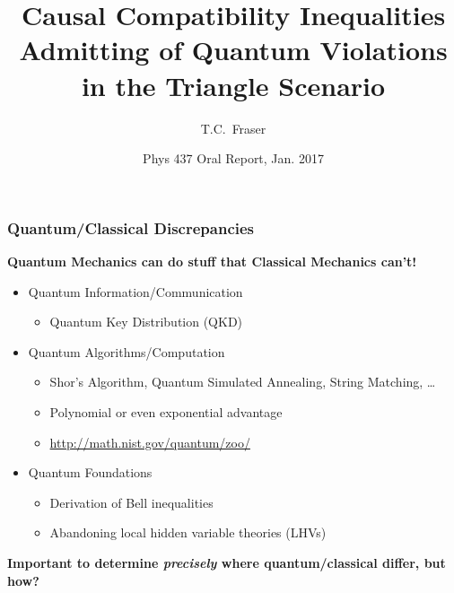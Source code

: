 \documentclass[
    hyperref={bookmarks=false},%
    xcolor={dvipsnames},
]{beamer}
\title[Triangle Inequalities]{Causal Compatibility Inequalities Admitting of Quantum Violations in the Triangle Scenario}
\author[Fraser]{T.C.~Fraser\inst{1,2}}
\institute
{
    \inst{1}%
    Perimeter Institute for Theoretical Physics\\
    Ontario, Canada \\
    \inst{2}%
    University of Waterloo\\
    Ontario, Canada \\
}
\date[Phys 437 2017]{Phys 437 Oral Report, Jan. 2017}
\begin{document}
\begin{frame}
    \titlepage
\end{frame}


\begin{frame}
    \frametitle{Quantum/Classical Discrepancies}
    \textbf{Quantum Mechanics can do stuff that Classical Mechanics can't!}
    \begin{itemize}
        \item Quantum Information/Communication
        \begin{itemize}
            \item Quantum Key Distribution (QKD)
        \end{itemize}
    \end{itemize}
    \begin{itemize}
        \item Quantum Algorithms/Computation
        \begin{itemize}
            \item Shor's Algorithm, Quantum Simulated Annealing, String Matching, \ldots
            \item Polynomial or even exponential advantage
            \item \url{http://math.nist.gov/quantum/zoo/}
        \end{itemize}
    \end{itemize}
    \begin{itemize}
        \item Quantum Foundations
        \begin{itemize}
            \item Derivation of Bell inequalities
            \item Abandoning local hidden variable theories (LHVs)
        \end{itemize}
    \end{itemize}
    \textbf{Important to determine \textit{precisely} where quantum/classical differ, but how?}
\end{frame}
\end{document}
